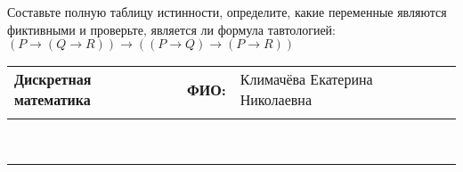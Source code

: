 \documentclass[10pt]{exam}
\newcommand{\class}{Дискретная математика}
\newcommand{\examdate}{}
\begin{document}
\begin{questions}
\begin{enumerate} [a)]
\end{enumerate}\question Составьте полную таблицу истинности, определите, какие переменные являются фиктивными и проверьте, является ли формула тавтологией:
$(P \rightarrow (Q \rightarrow R)) \rightarrow ((P \rightarrow Q) \rightarrow (P \rightarrow R))$

\end{questions}
\newpage
\begin{flushright}
\begin{tabular}{p{2.8in} r l}
\textbf{\class} & \textbf{ФИО:} &Климачёва Екатерина Николаевна
\\

\textbf{\examdate} &&\\
\end{tabular}\\
\end{flushright}
\rule[1ex]{\textwidth}{.1pt}
\end{document}
